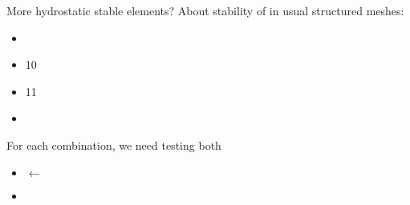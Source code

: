 

\begin{frame}{More hydrostatic stable elements?}
  About stability of \hydStokes in usual structured
  meshes:\bigskip
  \begin{itemize}\itemsep1em
  \item {} \ \good
  \item {}10 \ \question
  \item {}11 \ \question
  \item {} \ \question
  \end{itemize}
  \bigskip
  For each combination, we need testing both
  \begin{itemize}
  \item \ISph $\leftarrow$ 
  \item \ISvh
  \end{itemize}
\end{frame}


\newcommand{\nv}{n}
\renewcommand{\imgdir}{img/}

